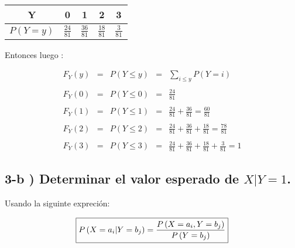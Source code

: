 \documentclass[12pt]{article}
\begin{document}
\begin{center}
    \renewcommand{\arraystretch}{1.5}
    \begin{tabular}{|c|c|c|c|c|}
        \hline
        Y                   & 0               & 1               & 2               & 3
        \\
        \hline
        $P\left(Y=y\right)$ & $\frac{24}{81}$ & $\frac{36}{81}$ & $\frac{18}{81}$ & $\frac{3}{81}$
        \\
        \hline
    \end{tabular}
\end{center}


Entonces luego :

\begin{equation*}
    \begin{array}{rcccl}
        F_Y\left(y\right) & = & P\left(Y \leq y\right)
                         & = & \displaystyle \sum_{i\leq y} P\left(Y=i\right)
        \\
        \\
        F_Y\left(0\right) & = & P\left(Y\leq0\right)        & = & \displaystyle \frac{24}{81}
        \\
        \\
        F_Y\left(1\right) & = & P\left(Y\leq1\right)        & = & \displaystyle \frac{24}{81} + \frac{36}{81} = \frac{60}{81}
        \\
        \\
        F_Y\left(2\right) & = & P\left(Y\leq2\right)        & = & \displaystyle \frac{24}{81} + \frac{36}{81} + \frac{18}{81} = \frac{78}{81}
        \\
        \\
        F_Y\left(3\right) & = & P\left(Y\leq3\right)        & = & \displaystyle \frac{24}{81} + \frac{36}{81} + \frac{18}{81} + \frac{3}{81}  = 1
    \end{array}
\end{equation*}


\subsection*{ 3-b ) Determinar el valor esperado de $ X|Y = 1$.}

Usando la  siguinte expreci\'on:


\begin{equation*}
    \fbox{$
    \displaystyle P\left(X = a_i|Y = b_j\right)  =  \frac{P\left(X = a_i,Y = b_j\right)}{P\left(Y = b_j\right)}
    $}
\end{equation*}
\end{document}
